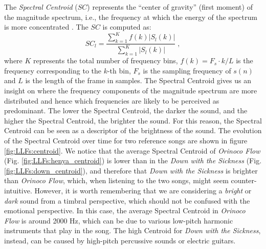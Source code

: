 The \textit{Spectral Centroid} ($SC$) represents the ``center of gravity'' (first moment) of the magnitude spectrum, i.e., the frequency at which the energy of the spectrum is more concentrated \cite{weihs2016music}. The $SC$ is computed as:
\begin{equation}\label{eq:FSC}
SC_l = \frac{\sum\limits_{k=1}^{K}f(k)|S_l(k)|}{\sum\limits_{k=1}^{K}|S_l(k)|} \; ,
\end{equation}
where $K$ represents the total number of frequency bins, $f(k)=F_s \cdot k/L $ is the frequency corresponding to the $k$-th bin, $F_s$ is the sampling frequency of $s(n)$ and $L$ is the length of the frame in samples. The Spectral Centroid gives us an insight on where the frequency components of the magnitude spectrum are more distributed and hence which frequencies are likely to be perceived as predominant. The lower the Spectral Centroid, the darker the sound, and the higher the Spectral Centroid, the brighter the sound. For this reason, the Spectral Centroid can be seen as a descriptor of the brightness of the sound. The evolution of the Spectral Centroid over time for two reference songs are shown in figure \ref{fig:LLFs:centroid}. We notice that the average Spectral Centroid of \textit{Orinoco Flow} (Fig. \ref{fig:LLFs:henya_centroid}) is lower than in the \textit{Down with the Sickness} (Fig. \ref{fig:LLFs:down_centroid}), and therefore that \textit{Down with the Sickness} is brighter than \textit{Orinoco Flow}, which, when listening to the two songs, might seem counter-intuitive. However, it is worth remembering that we are considering a \textit{bright} or \textit{dark} sound from a timbral perspective, which should not be confused with the emotional perspective. In this case, the average Spectral Centroid in  \textit{Orinoco Flow} is around 2000 Hz, which can be due to various low-pitch harmonic instruments that play in the song. The high Centroid for \textit{Down with the Sickness}, instead, can be caused by high-pitch percussive sounds or electric guitars.

